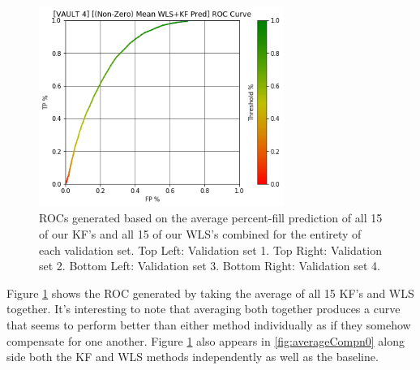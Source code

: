 \begin{figure}[h]
\includegraphics[width=8cm]{body/results/Graphs/JustSeries/1.PerformaceofMean/4.Combine/Non-Zero/v4.png}
\caption{ROCs generated based on the average percent-fill prediction of all 15 of our KF's and all 15 of our WLS's combined for the entirety of each validation set. Top Left: Validation set 1. Top Right: Validation set 2. Bottom Left: Validation set 3. Bottom Right: Validation set 4.}
\label{fig:averageCombn0}
\end{figure}

Figure \ref{fig:averageCombn0} shows the ROC generated by taking the average of all 15 KF's and WLS together. It's interesting to note that averaging both together produces a curve that seems to perform better than either method individually as if they somehow compensate for one another. Figure \ref{fig:averageCombn0} also appears in \ref{fig:averageCompn0} along side both the KF and WLS methods independently as well as the baseline.

\pagebreak

